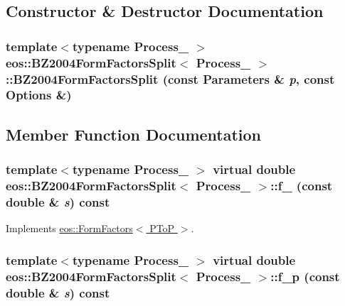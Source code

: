 \subsection{Constructor \& Destructor Documentation}
\hypertarget{classeos_1_1BZ2004FormFactorsSplit_a2931b80b68b116f4f51c966649421286}{
\subsubsection[{BZ2004FormFactorsSplit}]{\setlength{\rightskip}{0pt plus 5cm}template$<$typename Process\_\- $>$ {\bf eos::BZ2004FormFactorsSplit}$<$ Process\_\- $>$::{\bf BZ2004FormFactorsSplit} (const {\bf Parameters} \& {\em p}, \/  const {\bf Options} \&)}}
\label{classeos_1_1BZ2004FormFactorsSplit_a2931b80b68b116f4f51c966649421286}


\subsection{Member Function Documentation}
\hypertarget{classeos_1_1BZ2004FormFactorsSplit_a4963dfd717bb53dcb1093535a6697e89}{
\subsubsection[{f\_\-0}]{\setlength{\rightskip}{0pt plus 5cm}template$<$typename Process\_\- $>$ virtual double {\bf eos::BZ2004FormFactorsSplit}$<$ Process\_\- $>$::f\_ (const double \& {\em s}) const}}
\label{classeos_1_1BZ2004FormFactorsSplit_a4963dfd717bb53dcb1093535a6697e89}


Implements \hyperlink{classeos_1_1FormFactors_3_01PToP_01_4_a097a12cde6acb9004d1a92cbb8e60734}{eos::FormFactors$<$ PToP $>$}.\hypertarget{classeos_1_1BZ2004FormFactorsSplit_a58d02490b96eaea8923e8252205ec60a}{
\subsubsection[{f\_\-p}]{\setlength{\rightskip}{0pt plus 5cm}template$<$typename Process\_\- $>$ virtual double {\bf eos::BZ2004FormFactorsSplit}$<$ Process\_\- $>$::f\_\-p (const double \& {\em s}) const}}
\label{classeos_1_1BZ2004FormFactorsSplit_a58d02490b96eaea8923e8252205ec60a}


